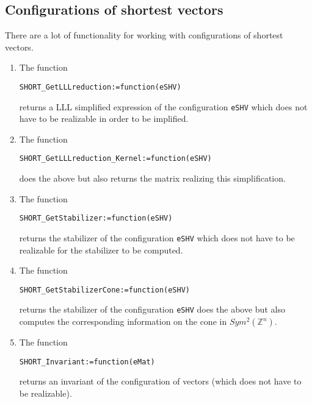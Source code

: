 \documentclass[12pt]{amsart}
\newcommand{\ZZ}{\ensuremath{\mathbb{Z}}}
\begin{document}



\subsection{Configurations of shortest vectors}

There are a lot of functionality for working with configurations of shortest vectors.


\begin{enumerate}
\item The function
\begin{verbatim}
SHORT_GetLLLreduction:=function(eSHV)
\end{verbatim}
returns a LLL simplified expression of the configuration {\tt eSHV} which does not have to be realizable in order to be implified.

\item The function
\begin{verbatim}
SHORT_GetLLLreduction_Kernel:=function(eSHV)
\end{verbatim}
does the above but also returns the matrix realizing this simplification.

\item The function
\begin{verbatim}
SHORT_GetStabilizer:=function(eSHV)
\end{verbatim}
returns the stabilizer of the configuration {\tt eSHV} which does not have to be realizable for the stabilizer to be computed.

\item The function
\begin{verbatim}
SHORT_GetStabilizerCone:=function(eSHV)
\end{verbatim}
returns the stabilizer of the configuration {\tt eSHV} does the above but also computes the corresponding information on the cone in $Sym^2(\ZZ^n)$.

\item The function
\begin{verbatim}
SHORT_Invariant:=function(eMat)
\end{verbatim}
returns an invariant of the configuration of vectors (which does not have to be realizable).


\end{enumerate}
\end{document}
